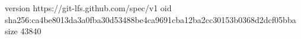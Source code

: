 version https://git-lfs.github.com/spec/v1
oid sha256:ca4be8013da3a0fba30d53488be4ca9691cba12ba2cc30153b0368d2dcf05bba
size 43840
